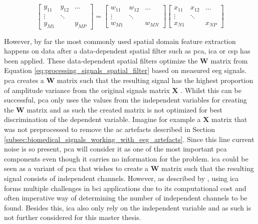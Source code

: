 \begin{equation}
    \label{eq:processing_signals_spatial_filter}
    \begin{bmatrix} 
        y_{11} & y_{12} & \dots \\
        \vdots & \ddots & \\
        y_{M1} &        & y_{MP} 
    \end{bmatrix} = 
    \begin{bmatrix} 
        w_{11} & w_{12} & \dots \\
        \vdots & \ddots & \\
        w_{M1} &        & w_{MN} 
    \end{bmatrix}
    \begin{bmatrix} 
        x_{11} & x_{12} & \dots \\
        \vdots & \ddots & \\
        x_{N1} &        & x_{NP} 
    \end{bmatrix}
\end{equation}


However, by far the most commonly used spatial domain feature extraction happens on data after a data-dependent spatial filter such as \gls{pca}, \gls{ica} or \gls{csp} has been applied.
These data-dependent spatial filters optimize the $\mathbf{W}$ matrix from Equation \ref{eq:processing_signals_spatial_filter} based on measured \gls{eeg} signals.
\Gls{pca} creates a $\mathbf{W}$ matrix such that the resulting signal has the highest proportion of amplitude variance from the original signals matrix $\mathbf{X}$ \citep{bci_book}.
Whilst this can be successful, \gls{pca} only uses the values from the independent variables for creating the $\mathbf{W}$ matrix and as such the created matrix is not optimized for best discrimination of the dependent variable.
Imagine for example a $\mathbf{X}$ matrix that was not preprocessed to remove the \gls{ac} artefacts described in Section \ref{subsec:biomedical_signals_working_with_eeg_artefacts}.
Since this line current noise is so present, \gls{pca} will consider it as one of the most important \gls{pca} components even though it carries no information for the problem.
\Gls{ica} could be seen as a variant of \gls{pca} that wishes to create a $\mathbf{W}$ matrix such that the resulting signal consists of independent channels.
However, as described by \citet{bci_book}, using \gls{ica} forms multiple challenges in \gls{bci} applications due to its computational cost and often imperative way of determining the number of independent channels to be found.
Besides this, \gls{ica} also only rely on the independent variable and as such is not further considered for this master thesis.

